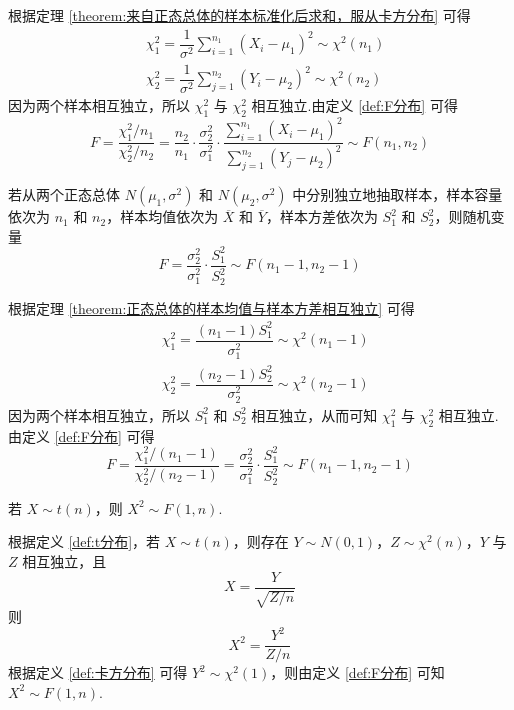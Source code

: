 \begin{myproof}
    根据定理 \ref{theorem:来自正态总体的样本标准化后求和，服从卡方分布} 可得
    $$
    \begin{aligned}
        & \chi_1^2 = \dfrac{1}{\sigma^2} \sum_{i=1}^{n_1} (X_i - \mu_1)^2 \sim \chi^2(n_1) \\
        & \chi_2^2 = \dfrac{1}{\sigma^2} \sum_{j=1}^{n_2} (Y_i - \mu_2)^2 \sim \chi^2(n_2)
    \end{aligned}
    $$
    因为两个样本相互独立，所以 $\chi_1^2$ 与 $\chi_2^2$ 相互独立.由定义 \ref{def:F分布} 可得
    $$
    F = \dfrac{\chi_1^2 / n_1}{\chi_2^2 / n_2} = \dfrac{n_2}{n_1} \cdot \dfrac{\sigma_2^2}{\sigma_1^2} \cdot \dfrac{\displaystyle\sum_{i=1}^{n_1} (X_i - \mu_1)^2}{\displaystyle\sum_{j=1}^{n_2} (Y_j - \mu_2)^2} \sim F(n_1, n_2)
    $$
\end{myproof}

\begin{theorem}
    若从两个正态总体 $N(\mu_1, \sigma^2)$ 和 $N(\mu_2, \sigma^2)$ 中分别独立地抽取样本，样本容量依次为 $n_1$ 和 $n_2$，样本均值依次为 $\overline{X}$ 和 $\overline{Y}$，样本方差依次为 $S_1^2$ 和 $S_2^2$，则随机变量
    $$
    F = \dfrac{\sigma_2^2}{\sigma_1^2} \cdot \dfrac{S_1^2}{S_2^2} \sim F(n_1 - 1, n_2 - 1)
    $$
\end{theorem}

\begin{myproof}
    根据定理 \ref{theorem:正态总体的样本均值与样本方差相互独立} 可得
    $$
    \begin{aligned}
        & \chi_1^2 = \dfrac{(n_1 - 1) S_1^2}{\sigma_1^2} \sim \chi^2(n_1 - 1) \\
        & \chi_2^2 = \dfrac{(n_2 - 1) S_2^2}{\sigma_2^2} \sim \chi^2(n_2 - 1)
    \end{aligned}
    $$
    因为两个样本相互独立，所以 $S_1^2$ 和 $S_2^2$ 相互独立，从而可知 $\chi_1^2$ 与 $\chi_2^2$ 相互独立.由定义 \ref{def:F分布} 可得
    $$
    F = \dfrac{\chi_1^2 / (n_1 - 1)}{\chi_2^2 / (n_2 - 1)} = \dfrac{\sigma_2^2}{\sigma_1^2} \cdot \dfrac{S_1^2}{S_2^2} \sim F(n_1 - 1, n_2 - 1)
    $$
\end{myproof}

\begin{conclusion}
    若 $X \sim t(n)$，则 $X^2 \sim F(1,n)$.
\end{conclusion}

\begin{myproof}
    根据定义 \ref{def:t分布}，若 $X \sim t(n)$，则存在 $Y \sim N(0,1)$，$Z \sim \chi^2(n)$，$Y$ 与 $Z$ 相互独立，且
    $$
    X = \dfrac{Y}{\sqrt{Z / n}}
    $$
    则
    $$
    X^2 = \dfrac{Y^2}{Z / n}
    $$
    根据定义 \ref{def:卡方分布} 可得 $Y^2 \sim \chi^2(1)$，则由定义 \ref{def:F分布} 可知 $X^2 \sim F(1,n)$.
\end{myproof}